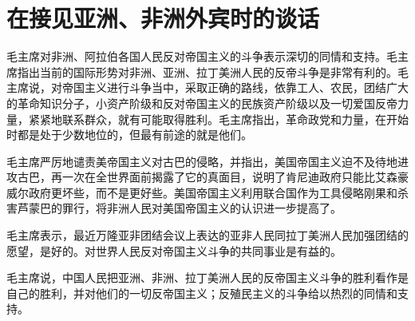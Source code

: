 \section[在接见亚洲、非洲外宾时的谈话（一九六一年四月二十八日）]{在接见亚洲、非洲外宾时的谈话}

毛主席对非洲、阿拉伯各国人民反对帝国主义的斗争表示深切的同情和支持。毛主席指出当前的国际形势对非洲、亚洲、拉丁美洲人民的反帝斗争是非常有利的。毛主席说，对帝国主义进行斗争当中，采取正确的路线，依靠工人、农民，团结广大的革命知识分子，小资产阶级和反对帝国主义的民族资产阶级以及一切爱国反帝力量，紧紧地联系群众，就有可能取得胜利。毛主席指出，革命政党和力量，在开始时都是处于少数地位的，但最有前途的就是他们。

毛主席严厉地谴责美帝国主义对古巴的侵略，并指出，美国帝国主义迫不及待地进攻古巴，再一次在全世界面前揭露了它的真面目，说明了肯尼迪政府只能比艾森豪威尔政府更坏些，而不是更好些。美国帝国主义利用联合国作为工具侵略刚果和杀害芦蒙巴的罪行，将非洲人民对美国帝国主义的认识进一步提高了。

毛主席表示，最近万隆亚非团结会议上表达的亚非人民同拉丁美洲人民加强团结的愿望，是好的。对世界人民反对帝国主义斗争的共同事业是有益的。

毛主席说，中国人民把亚洲、非洲、拉丁美洲人民的反帝国主义斗争的胜利看作是自己的胜利，并对他们的一切反帝国主义；反殖民主义的斗争给以热烈的同情和支持。


